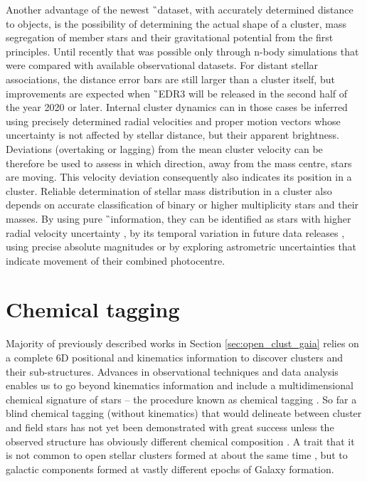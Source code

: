 Another advantage of the newest \G\ dataset, with accurately determined distance to objects, is the possibility of determining the actual shape of a cluster, mass segregation of member stars and their gravitational potential from the first principles. Until recently that was possible only through n-body simulations \cite{1987MNRAS.224..193T, 2016MNRAS.456.3757S, 2018MNRAS.473..849D} that were compared with available observational datasets. For distant stellar associations, the distance error bars are still larger than a cluster itself, but improvements are expected when \G\ EDR3 will be released in the second half of the year 2020 or later. Internal cluster dynamics can in those cases be inferred using precisely determined radial velocities and proper motion vectors whose uncertainty is not affected by stellar distance, but their apparent brightness. Deviations (overtaking or lagging) from the mean cluster velocity can be therefore be used to assess in which direction, away from the mass centre, stars are moving. This velocity deviation consequently also indicates its position in a cluster. Reliable determination of stellar mass distribution in a cluster also depends on accurate classification of binary or higher multiplicity stars and their masses. By using pure \G\ information, they can be identified as stars with higher radial velocity uncertainty \cite{2018RNAAS...2b..20E}, by its temporal variation in future data releases \cite{2019AJ....158..155B}, using precise absolute magnitudes \cite{2018ApJ...857..114W, 2018A&A...616A..10G, 2019MNRAS.487.2474C} or by exploring astrometric uncertainties \cite{2020arXiv200305467B} that indicate movement of their combined photocentre. 

\section{Chemical tagging}
\label{sec:open_clustesr_tagging}
Majority of previously described works in Section \ref{sec:open_clust_gaia} relies on a complete 6D positional and kinematics information to discover clusters and their sub-structures. Advances in observational techniques and data analysis enables us to go beyond kinematics information and include a multidimensional chemical signature of stars -- the procedure known as chemical tagging \cite{2002ARA&A..40..487F, 2010ApJ...721..582B}. So far a blind chemical tagging (without kinematics) that would delineate between cluster and field stars has not yet been demonstrated with great success unless the observed structure has obviously different chemical composition \cite{2016ApJ...833..262H}. A trait that it is not common to open stellar clusters formed at about the same time \cite{2019A&A...629A..34G}, but to galactic components formed at vastly different epochs \cite{2018A&A...619A.125A} of Galaxy formation.

